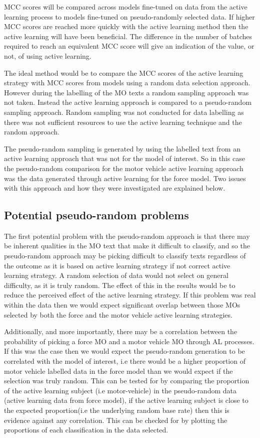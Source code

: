 MCC scores will be compared across models fine-tuned on data from the active learning process to models fine-tuned on pseudo-randomly selected data. If higher MCC scores are reached more quickly with the active learning method then the active learning will have been beneficial. The difference in the number of batches required to reach an equivalent MCC score will give an indication of the value, or not, of using active learning. 

The ideal method would be to compare the MCC scores of the active learning strategy with MCC scores from models using a random data selection approach. However during the labelling of the MO texts a random sampling approach was not taken.  Instead the active learning approach is compared to a pseudo-random sampling approach. Random sampling was not conducted for data labelling as there was not sufficient resources to use the active learning technique and the random approach.

The pseudo-random sampling is generated by using the labelled text from an active learning approach that was not for the model of interest. So in this case the pseudo-random comparison for the motor vehicle active learning approach was the data generated through active learning for the force model. Two issues with this approach and how they were investigated are explained below.

\subsection{Potential pseudo-random problems}
The first potential problem with the pseudo-random approach is that there may be inherent qualities in the MO text that make it difficult to classify, and so the pseudo-random approach may be picking difficult to classify texts regardless of the outcome as it is based on  active learning strategy if not  correct active learning strategy. A random selection of data would not select on general difficulty, as it is truly random. The effect of this in the results would be to reduce the perceived effect of the active learning strategy. If this problem was real within the data then we would expect significant overlap between those MOs selected by both the force and the motor vehicle active learning strategies. 

Additionally, and more importantly, there may be a correlation between the probability of picking a force MO and a motor vehicle MO through AL processes. If this was the case then we would expect the pseudo-random generation to be correlated with the model of interest, i.e there would be a higher proportion of motor vehicle labelled data in the force model than we would expect if the selection was truly random. This can be tested for by comparing the proportion of the active learning subject (i.e motor-vehicle) in the pseudo-random data (active learning data from force model), if the active learning subject is close to the expected proportion(i.e the underlying random base rate) then this is evidence against any correlation. This can be checked for by plotting the proportions of each classification in the data selected.  

